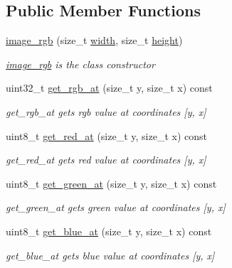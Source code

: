 \subsection*{Public Member Functions}
\begin{DoxyCompactItemize}
\item 
\hyperlink{classcloud__object__segmentation_1_1image__rgb_a914311c2f5a1ce14bcddb96d02d667bf}{image\+\_\+rgb} (size\+\_\+t \hyperlink{classcloud__object__segmentation_1_1image_ac46913c2b63ca4d8e60f267a374429be}{width}, size\+\_\+t \hyperlink{classcloud__object__segmentation_1_1image_ad0e1ec069c7c5f8cde4cc1cd3f86ad1c}{height})
\begin{DoxyCompactList}\small\item\em \hyperlink{classcloud__object__segmentation_1_1image__rgb}{image\+\_\+rgb} is the class constructor \end{DoxyCompactList}\item 
uint32\+\_\+t \hyperlink{classcloud__object__segmentation_1_1image__rgb_a2e6b2c591e7b0664e572d2f5633eeb40}{get\+\_\+rgb\+\_\+at} (size\+\_\+t y, size\+\_\+t x) const 
\begin{DoxyCompactList}\small\item\em get\+\_\+rgb\+\_\+at gets rgb value at coordinates \mbox{[}y, x\mbox{]} \end{DoxyCompactList}\item 
uint8\+\_\+t \hyperlink{classcloud__object__segmentation_1_1image__rgb_ac58d3341c4919f16f59a61018e791d41}{get\+\_\+red\+\_\+at} (size\+\_\+t y, size\+\_\+t x) const 
\begin{DoxyCompactList}\small\item\em get\+\_\+red\+\_\+at gets red value at coordinates \mbox{[}y, x\mbox{]} \end{DoxyCompactList}\item 
uint8\+\_\+t \hyperlink{classcloud__object__segmentation_1_1image__rgb_a9e6c92158bff4ea6a1d7508d47bc7304}{get\+\_\+green\+\_\+at} (size\+\_\+t y, size\+\_\+t x) const 
\begin{DoxyCompactList}\small\item\em get\+\_\+green\+\_\+at gets green value at coordinates \mbox{[}y, x\mbox{]} \end{DoxyCompactList}\item 
uint8\+\_\+t \hyperlink{classcloud__object__segmentation_1_1image__rgb_a96739977229e971bca72aab38b2ce2b4}{get\+\_\+blue\+\_\+at} (size\+\_\+t y, size\+\_\+t x) const 
\begin{DoxyCompactList}\small\item\em get\+\_\+blue\+\_\+at gets blue value at coordinates \mbox{[}y, x\mbox{]} \end{DoxyCompactList}\item 

\end{DoxyCompactItemize}

